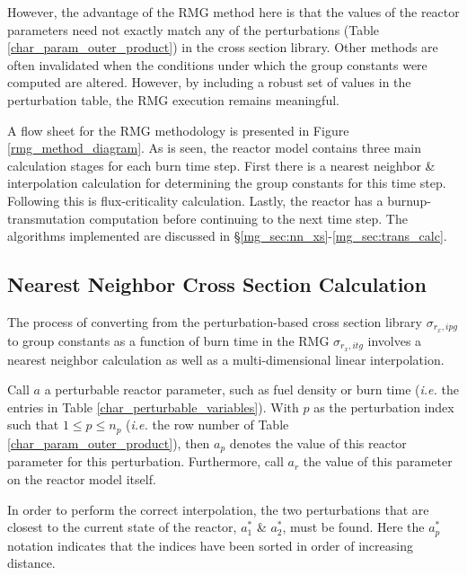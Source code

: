However, the advantage of the RMG method here is that the values of the reactor parameters
need not exactly match any of the perturbations (Table \ref{char_param_outer_product}) in the 
cross section library.  Other methods are often invalidated when the conditions under which 
the group constants were computed are altered.  However, by including a robust set of values
in the perturbation table, the RMG execution remains meaningful.



A flow sheet for the RMG methodology is presented in Figure \ref{rmg_method_diagram}.  As is
seen, the reactor model contains three main calculation stages for each burn time step.
First there is a nearest neighbor \& interpolation calculation for determining the group
constants for this time step.  Following this is flux-criticality calculation.  Lastly, the reactor
has a burnup-transmutation computation before continuing to the next time step.  The algorithms
implemented are discussed in \S \ref{mg_sec:nn_xs}-\ref{mg_sec:trans_calc}.


\subsection{Nearest Neighbor Cross Section Calculation}
\label{mg_sec:nn_xs}
The process of converting from the perturbation-based cross section library $\sigma_{r_x,ipg}$ to 
group constants as a function of burn time in the RMG $\sigma_{r_x,itg}$ involves a nearest 
neighbor calculation as well as a multi-dimensional linear interpolation.

Call $a$ a perturbable reactor parameter, such as fuel density or burn time (\emph{i.e.} the 
entries in Table \ref{char_perturbable_variables}).   With $p$ as the perturbation index 
such that $1 \le p \le n_p$ (\emph{i.e.} the row number of Table \ref{char_param_outer_product}), 
then $a_p$ denotes the value of this reactor parameter for this perturbation.  Furthermore, call
$a_r$ the value of this parameter on the reactor model itself.

In order to perform the correct interpolation, the two perturbations that are closest to the current
state of the reactor, $a_1^*$ \& $a_2^*$, must be found.  Here the $a_p^*$ notation indicates that 
the indices have been sorted in order of increasing distance.  

